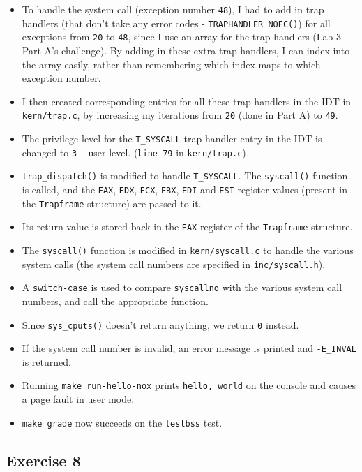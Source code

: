\documentclass[]{article}
\begin{document}
\begin{itemize}
\itemsep1pt\parskip0pt
\item
  To handle the system call (exception number \texttt{48}), I had to add
  in trap handlers (that don't take any error codes -
  \texttt{TRAPHANDLER\_NOEC()}) for all exceptions from \texttt{20} to
  \texttt{48}, since I use an array for the trap handlers (Lab 3 - Part
  A's challenge). By adding in these extra trap handlers, I can index
  into the array easily, rather than remembering which index maps to
  which exception number.
\item
  I then created corresponding entries for all these trap handlers in
  the IDT in \texttt{kern/trap.c}, by increasing my iterations from
  \texttt{20} (done in Part A) to \texttt{49}.
\item
  The privilege level for the \texttt{T\_SYSCALL} trap handler entry in
  the IDT is changed to \texttt{3} -- user level. (\texttt{line 79} in
  \texttt{kern/trap.c})
\item
  \texttt{trap\_dispatch()} is modified to handle \texttt{T\_SYSCALL}.
  The \texttt{syscall()} function is called, and the \texttt{EAX},
  \texttt{EDX}, \texttt{ECX}, \texttt{EBX}, \texttt{EDI} and
  \texttt{ESI} register values (present in the \texttt{Trapframe}
  structure) are passed to it.
\item
  Its return value is stored back in the \texttt{EAX} register of the
  \texttt{Trapframe} structure.
\item
  The \texttt{syscall()} function is modified in \texttt{kern/syscall.c}
  to handle the various system calls (the system call numbers are
  specified in \texttt{inc/syscall.h}).
\item
  A \texttt{switch-case} is used to compare \texttt{syscallno} with the
  various system call numbers, and call the appropriate function.
\item
  Since \texttt{sys\_cputs()} doesn't return anything, we return
  \texttt{0} instead.
\item
  If the system call number is invalid, an error message is printed and
  \texttt{-E\_INVAL} is returned.
\item
  Running \texttt{make run-hello-nox} prints \texttt{hello, world} on
  the console and causes a page fault in user mode.
\item
  \texttt{make grade} now succeeds on the \texttt{testbss} test.
\end{itemize}

\subsection{Exercise 8}
\end{document}
